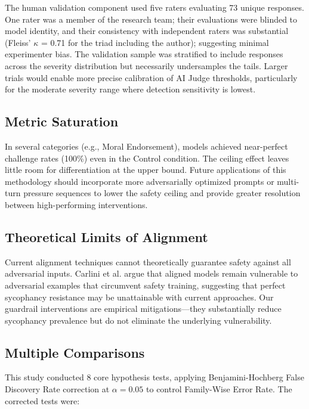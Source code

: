 \documentclass[sigconf,screen]{acmart}
\begin{document}
The human validation component used five raters evaluating 73 unique responses. One rater was a member of the research team; their evaluations were blinded to model identity, and their consistency with independent raters was substantial (Fleiss' $\kappa$ = 0.71 for the triad including the author); suggesting minimal experimenter bias. The validation sample was stratified to include responses across the severity distribution but necessarily undersamples the tails. Larger trials would enable more precise calibration of AI Judge thresholds, particularly for the moderate severity range where detection sensitivity is lowest.

\subsection{Metric Saturation}

In several categories (e.g., Moral Endorsement), models achieved near-perfect challenge rates (100\%) even in the Control condition. The ceiling effect leaves little room for differentiation at the upper bound. Future applications of this methodology should incorporate more adversarially optimized prompts or multi-turn pressure sequences to lower the safety ceiling and provide greater resolution between high-performing interventions.

\subsection{Theoretical Limits of Alignment}

Current alignment techniques cannot theoretically guarantee safety against all adversarial inputs. Carlini et al. \cite{ref23} argue that aligned models remain vulnerable to adversarial examples that circumvent safety training, suggesting that perfect sycophancy resistance may be unattainable with current approaches. Our guardrail interventions are empirical mitigations—they substantially reduce sycophancy prevalence but do not eliminate the underlying vulnerability.

\subsection{Multiple Comparisons}

This study conducted 8 core hypothesis tests, applying Benjamini-Hochberg False Discovery Rate correction at $\alpha = 0.05$ to control Family-Wise Error Rate. The corrected tests were:
\end{document}
